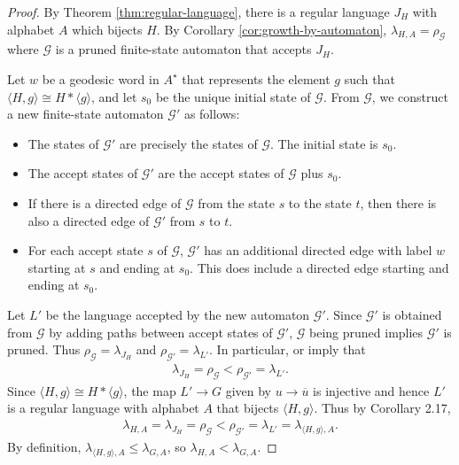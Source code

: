 \documentclass[11pt,letterpaper]{amsart}
\theoremstyle{definition}
\theoremstyle{plain}
\theoremstyle{TheoremNum}
\begin{document}
\begin{proof}
    By Theorem \ref{thm:regular-language}, there is a regular language $J_H$ with alphabet $A$ which bijects $H$. By Corollary \ref{cor:growth-by-automaton}, $\lambda_{H,A} = \rho_{\mathcal{G}}$ where $\mathcal{G}$ is a pruned finite-state automaton that accepts $J_H$.

    Let $w$ be a geodesic word in $A^{\star}$ that represents the element $g$ such that $\langle H , g \rangle \cong H * \langle g \rangle$, and let $s_0$ be the unique initial state of $\mathcal{G}$. From $\mathcal{G}$, we construct a new finite-state automaton $\mathcal{G'}$ as follows:
    \begin{itemize}
        \item The states of $\mathcal{G}'$ are precisely the states of $\mathcal{G}$. The initial state is $s_0$.
        \item The accept states of $\mathcal{G}'$ are the accept states of $\mathcal{G}$ plus $s_0$.
        \item If there is a directed edge of $\mathcal{G}$ from the state $s$ to the state $t$, then there is also a directed edge of $\mathcal{G}'$ from $s$ to $t$.
        \item For each accept state $s$ of $\mathcal{G}$, $\mathcal{G}'$ has an additional directed edge with label $w$ starting at $s$ and ending at $s_0$. This does include a directed edge starting and ending at $s_0$.
    \end{itemize}

    Let $L'$ be the language accepted by the new automaton $\mathcal{G}'$. Since $\mathcal{G}'$ is obtained from $\mathcal{G}$ by adding paths between accept states of $\mathcal{G}'$, $\mathcal{G}$ being pruned implies $\mathcal{G}'$ is pruned. Thus $\rho_{\mathcal{G}} = \lambda_{J_H}$ and $\rho_{\mathcal{G}'} = \lambda_{L'}$. In particular, \cite[Lemma~2.14]{CRSZ} or \cite[Lemma~3.2 and Theorem~3.4]{DFW} imply that 
    \begin{align*}
        \lambda_{J_H} = \rho_{\mathcal{G}} < \rho_{\mathcal{G}'} = \lambda_{L'}\text{.}
    \end{align*}
    Since $\langle H, g \rangle \cong H * \langle g \rangle$, the map $L' \rightarrow G$ given by $u \rightarrow \overline{u}$ is injective and hence $L'$ is a regular language with alphabet $A$ that bijects $\langle H , g \rangle$. Thus by \cite{CRSZ} Corollary 2.17, 
    \begin{align*}
        \lambda_{H,A} = \lambda_{J_H} = \rho_{\mathcal{G}} < \rho_{\mathcal{G}'} = \lambda_{L'} = \lambda_{\langle H , g \rangle, A}\text{.}
    \end{align*}
    By definition, $\lambda_{\langle H , g \rangle, A} \leq \lambda_{G,A}$, so $\lambda_{H,A} < \lambda_{G,A}$.
\end{proof}
\end{document}
